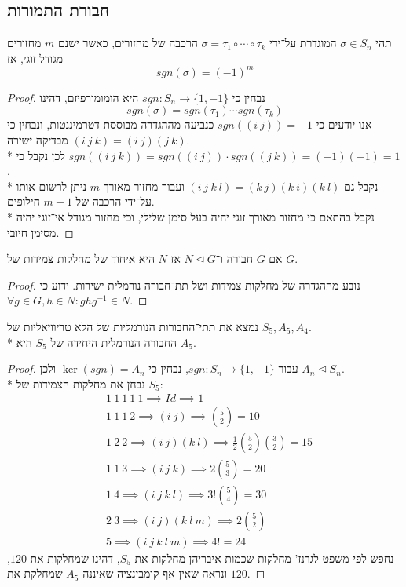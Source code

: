 \subsection{חבורת התמורות}
\begin{proposition}
	תהי $\sigma \in S_n$ המוגדרת על־ידי $\sigma = \tau_1 \circ \cdots \circ \tau_k$ הרכבה של מחזורים, כאשר ישנם $m$ מחזורים מגודל זוגי, אז
	\[
		sgn(\sigma) = {(-1)}^m
	\]
\end{proposition}
\begin{proof}
	נבחין כי $sgn : S_n \to \{1, -1\}$ היא הומומורפיזם, דהינו
	\[
		sgn(\sigma) = sgn(\tau_1) \cdots sgn(\tau_k)
	\]
	אנו יודעים כי $sgn((i\ j)) = -1$ כנביעה מההגדרה מבוססת דטרמיננטות, ונבחין כי $(i\ j\ k) = (i\ j)(j\ k)$ מבדיקה ישירה. \\*
	לכן נקבל כי $sgn((i\ j\ k)) = sgn((i\ j)) \cdot sgn((j\ k)) = (-1)(-1) = 1$. \\*
	נקבל גם $(i\ j\ k\ l) = (k\ j)(k\ i)(k\ l)$ ועבור מחזור מאורך $m$ ניתן לרשום אותו על־ידי הרכבה של $m - 1$ חילופים. \\*
	נקבל בהתאם כי מחזור מאורך זוגי יהיה בעל סימן שלילי, וכי מחזור מגודל אי־זוגי יהיה מסימן חיובי.
\end{proof}
\begin{proposition}
	אם $G$ חבורה ו־$N \trianglelefteq G$ אז $N$ היא איחוד של מחלקות צמידות של $G$.
\end{proposition}
\begin{proof}
	נובע מההגדרה של מחלקות צמידות ושל תת־חבורה נורמלית ישירות.
	ידוע כי $\forall g \in G, h \in N : g h g^{-1} \in N$.
\end{proof}
\begin{example}
	נמצא את תתי־החבורות הנורמליות של הלא טריוויאליות של $S_5, A_5, A_4$. \\*
	החבורה הנורמלית היחידה של $S_5$ היא $A_5$.
\end{example}
\begin{proof}
	עבור $sgn : S_n \to \{1, -1\}$, נבחין כי $\ker(sgn) = A_n$ ולכן $A_n \trianglelefteq S_n$. \\*
	נבחן את מחלקות הצמידות של $S_5$:
	\begin{align*}
		& 1\ 1\ 1\ 1\ 1 \implies Id \implies 1 \\
		& 1\ 1\ 1\ 2 \implies (i\ j) \implies \binom{5}{2} = 10 \\
		& 1\ 2\ 2 \implies (i\ j)(k\ l) \implies \frac{1}{2} \binom{5}{2} \binom{3}{2} = 15 \\
		& 1\ 1\ 3 \implies (i\ j\ k) \implies 2 \binom{5}{3} = 20 \\
		& 1\ 4 \implies (i\ j\ k\ l) \implies 3! \binom{5}{4} = 30 \\
		& 2\ 3 \implies (i\ j)(k\ l\ m) \implies 2 \binom{5}{2} \\
		& 5 \implies (i\ j\ k\ l\ m) \implies 4! = 24
	\end{align*}
	נחפש לפי משפט לגרנז' מחלקות שכמות איבריהן מחלקות את $S_5$, דהינו שמחלקות את $120$, ונראה שאין אף קומבינציה שאיננה $A_5$ שמחלקת את $120$.
\end{proof}
